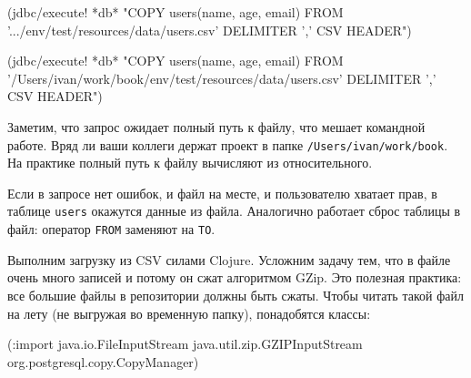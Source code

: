 \ifx\devicetype\mobile

\begin{english}
  \begin{clojure}
(jdbc/execute! *db*
 "COPY users(name, age, email)
  FROM
  '.../env/test/resources/data/users.csv'
  DELIMITER ',' CSV HEADER")
  \end{clojure}
\end{english}

\else

\begin{english}
  \begin{clojure}
(jdbc/execute! *db*
 "COPY users(name, age, email)
  FROM '/Users/ivan/work/book/env/test/resources/data/users.csv'
  DELIMITER ',' CSV HEADER")
  \end{clojure}
\end{english}

\fi

Заметим, что запрос ожидает полный путь к файлу, что мешает командной
работе. Вряд ли ваши коллеги держат проект в папке
\verb|/Users/ivan/work/book|. На практике полный путь к файлу вычисляют из
относительного.

Если в запросе нет ошибок, и файл на месте, и пользователю хватает прав, в
таблице \verb|users| окажутся данные из файла. Аналогично работает сброс
таблицы в файл: оператор \verb|FROM| заменяют на \verb|TO|.


Выполним загрузку из CSV силами Clojure. Усложним задачу тем, что в файле очень
много записей и потому он сжат алгоритмом GZip. Это полезная практика: все
большие файлы в репозитории должны быть сжаты. Чтобы читать такой файл на лету
(не выгружая во временную папку), понадобятся классы:

\begin{english}
  \begin{clojure}
(:import java.io.FileInputStream
         java.util.zip.GZIPInputStream
         org.postgresql.copy.CopyManager)
  \end{clojure}
\end{english}

